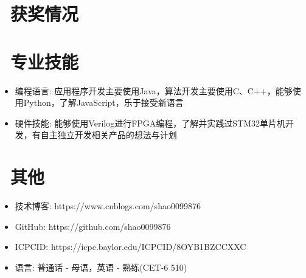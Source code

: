 \documentclass{resume}
\begin{document}

\section{\faHeartO\ 获奖情况}


\section{\faCogs\ 专业技能}
\begin{itemize}[parsep=0.5ex]
  \item 编程语言: 应用程序开发主要使用Java，算法开发主要使用C、C++，能够使用Python，了解JavaScript，乐于接受新语言
  \item 硬件技能: 能够使用Verilog进行FPGA编程，了解并实践过STM32单片机开发，有自主独立开发相关产品的想法与计划
\end{itemize}



\section{\faInfo\ 其他}
\begin{itemize}[parsep=0.5ex]
  \item 技术博客: https://www.cnblogs.com/shao0099876
  \item GitHub: https://github.com/shao0099876
  \item ICPCID: https://icpc.baylor.edu/ICPCID/8OYB1BZCCXXC
  \item 语言: 普通话 - 母语，英语 - 熟练(CET-6 510)
\end{itemize}

%
%
\end{document}
